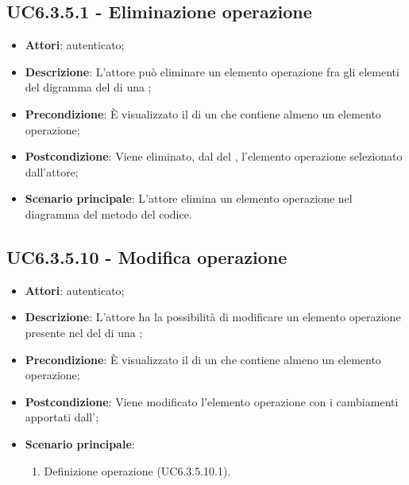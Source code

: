 \subsection{UC6.3.5.1 - Eliminazione operazione}
\label{ssec:UC6.3.5.1}
\begin{itemize}
\item \textbf{Attori}:  autenticato;
\item \textbf{Descrizione}: L'attore può eliminare un elemento operazione fra gli elementi del digramma del  di una ;
\item \textbf{Precondizione}: È visualizzato il  di un  che contiene almeno un elemento operazione;
\item \textbf{Postcondizione}: Viene eliminato, dal  del ,  l'elemento operazione selezionato dall'attore;
\item \textbf{Scenario principale}: L'attore elimina un elemento operazione nel diagramma del metodo del codice.
\end{itemize}
\subsection{UC6.3.5.10 - Modifica operazione}
\label{ssec:UC6.3.5.10}
\begin{itemize}
\item \textbf{Attori}:  autenticato;
\item \textbf{Descrizione}: L'attore ha la possibilità di modificare un elemento operazione presente nel  del  di una ;
\item \textbf{Precondizione}: È visualizzato il  di un  che contiene almeno un elemento operazione;
\item \textbf{Postcondizione}: Viene modificato l'elemento operazione con i cambiamenti apportati dall';
\item \textbf{Scenario principale}: \begin{enumerate}\item Definizione operazione (UC6.3.5.10.1).
 \end{enumerate}
\end{itemize}
